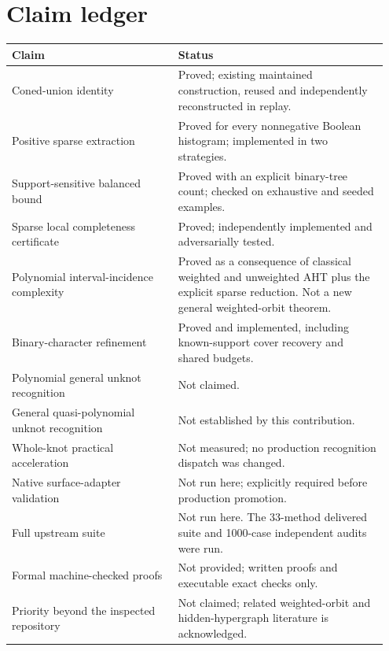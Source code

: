 \documentclass[11pt,letterpaper]{article}
\begin{document}
\section{Claim ledger}
\begin{longtable}{@{}p{0.42\linewidth}p{0.53\linewidth}@{}}
\toprule
Claim & Status\\
\midrule
\endhead
Coned-union identity & Proved; existing maintained construction, reused and independently reconstructed in replay.\\
Positive sparse extraction & Proved for every nonnegative Boolean histogram; implemented in two strategies.\\
Support-sensitive balanced bound & Proved with an explicit binary-tree count; checked on exhaustive and seeded examples.\\
Sparse local completeness certificate & Proved; independently implemented and adversarially tested.\\
Polynomial interval-incidence complexity & Proved as a consequence of classical weighted and unweighted AHT plus the explicit sparse reduction. Not a new general weighted-orbit theorem.\\
Binary-character refinement & Proved and implemented, including known-support cover recovery and shared budgets.\\
Polynomial general unknot recognition & Not claimed.\\
General quasi-polynomial unknot recognition & Not established by this contribution.\\
Whole-knot practical acceleration & Not measured; no production recognition dispatch was changed.\\
Native surface-adapter validation & Not run here; explicitly required before production promotion.\\
Full upstream suite & Not run here. The 33-method delivered suite and 1000-case independent audits were run.\\
Formal machine-checked proofs & Not provided; written proofs and executable exact checks only.\\
Priority beyond the inspected repository & Not claimed; related weighted-orbit and hidden-hypergraph literature is acknowledged.\\
\bottomrule
\end{longtable}



\end{document}
